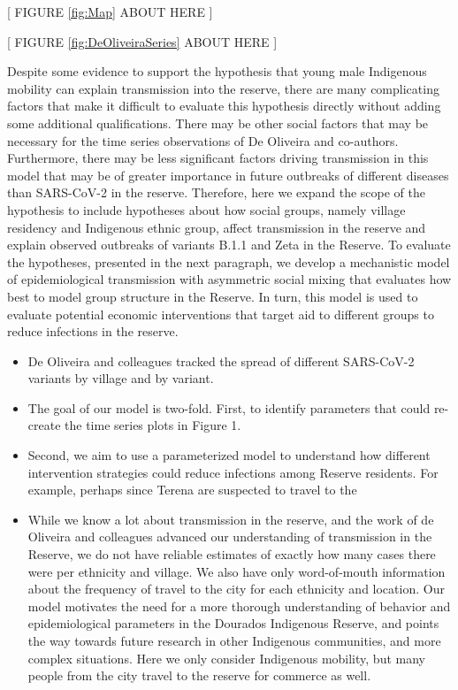 \documentclass[
  letterpaper,
  abstract]{scrartcl}
\begin{document}
\vspace{0.5em}
\begin{center}
{[ FIGURE \ref{fig:Map} ABOUT HERE ]} \\
\end{center}

\vspace{0.5em}
\begin{center}
{[ FIGURE \ref{fig:DeOliveiraSeries} ABOUT HERE ]} \\
\end{center}

Despite some evidence to support the hypothesis that young male
Indigenous mobility can explain transmission into the reserve, there are
many complicating factors that make it difficult to evaluate this
hypothesis directly without adding some additional qualifications. There
may be other social factors that may be necessary for the time series
observations of De Oliveira and co-authors. Furthermore, there may be
less significant factors driving transmission in this model that may be
of greater importance in future outbreaks of different diseases than
SARS-CoV-2 in the reserve. Therefore, here we expand the scope of the
hypothesis to include hypotheses about how social groups, namely village
residency and Indigenous ethnic group, affect transmission in the
reserve and explain observed outbreaks of variants B.1.1 and Zeta in the
Reserve. To evaluate the hypotheses, presented in the next paragraph, we
develop a mechanistic model of epidemiological transmission with
asymmetric social mixing that evaluates how best to model group
structure in the Reserve. In turn, this model is used to evaluate
potential economic interventions that target aid to different groups to
reduce infections in the reserve.

\begin{itemize}
\item
  De Oliveira and colleagues tracked the spread of different SARS-CoV-2
  variants by village and by variant.
\item
  The goal of our model is two-fold. First, to identify parameters that
  could re-create the time series plots in Figure 1.
\item
  Second, we aim to use a parameterized model to understand how
  different intervention strategies could reduce infections among
  Reserve residents. For example, perhaps since Terena are suspected to
  travel to the
\item
  While we know a lot about transmission in the reserve, and the work of
  de Oliveira and colleagues advanced our understanding of transmission
  in the Reserve, we do not have reliable estimates of exactly how many
  cases there were per ethnicity and village. We also have only
  word-of-mouth information about the frequency of travel to the city
  for each ethnicity and location. Our model motivates the need for a
  more thorough understanding of behavior and epidemiological parameters
  in the Dourados Indigenous Reserve, and points the way towards future
  research in other Indigenous communities, and more complex situations.
  Here we only consider Indigenous mobility, but many people from the
  city travel to the reserve for commerce as well.
\end{itemize}
\end{document}
